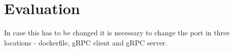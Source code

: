 \chapter{Evaluation\label{cha:chapter6}}
In case this has to be changed it is necessary to change the port in three locations - dockerfile, gRPC client and gRPC server. 


